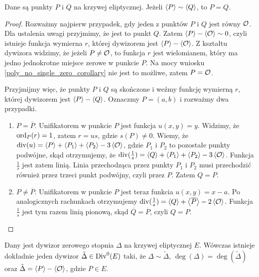 \begin{lemma}\label{sim_pq_eq_pq_lemma}
Dane są punkty $P$ i $Q$ na krzywej eliptycznej.
Jeżeli $\left\langle P\right\rangle \sim \left\langle Q\right\rangle$,
to $P = Q$.
\end{lemma}

\begin{proof}
Rozważmy najpierw przypadek,
gdy jeden z punktów $P$ i $Q$ jest równy $\mathcal{O}$.
Dla ustalenia uwagi przyjmimy, że jest to punkt $Q$.
Zatem $\left\langle P\right\rangle - \left\langle\mathcal{O}\right\rangle \sim 0$,
czyli istnieje funkcja wymierna $r$,
której dywizorem jest $\left\langle P\right\rangle - \left\langle\mathcal{O}\right\rangle$.
Z kształtu dywizora widzimy, że jeżeli $P \neq \mathcal{O}$, to funkcja $r$
jest wielomianem, który ma jedno jednokrotne miejsce zerowe w punkcie $P$.
Na mocy wniosku \ref{poly_no_single_zero_corollary} nie jest to możliwe,
zatem $P = \mathcal{O}$.

Przyjmijmy więc, że punkty $P$ i $Q$ są skończone
i weźmy funkcję wymierną $r$, której dywizorem jest $\left\langle P\right\rangle - \left\langle Q\right\rangle$.
Oznaczmy $P = (a, b)$ i rozważmy dwa przypadki.
\begin{enumerate}
\item $P = \overline{P}$.
Unifikatorem w punkcie $P$ jest funkcja $u(x, y) = y$.
Widzimy, że $\operatorname{ord}_P(r) = 1$, zatem $r = us$, gdzie $s(P) \neq 0$.
Wiemy, że $\operatorname{div}(u) = \left\langle P\right\rangle + \left\langle P_1\right\rangle + \left\langle P_2\right\rangle - 3\left\langle\mathcal{O}\right\rangle$,
gdzie $P_1$ i $P_2$ to pozostałe punkty podwójne,
skąd otrzymujemy, że
$\operatorname{div}(\frac{1}{s}) = \left\langle Q\right\rangle + \left\langle P_1\right\rangle + \left\langle P_2\right\rangle - 3\left\langle\mathcal{O}\right\rangle$.
Funkcja $\frac{1}{s}$ jest zatem linią.
Linia przechodząca przez punkty $P_1$ i $P_2$ musi przechodzić również przez
trzeci punkt podwójny, czyli przez $P$. Zatem $Q = P$.
\item $P \neq \overline{P}$.
Unifikatorem w punkcie $P$ jest teraz funkcia $u(x, y) = x - a$.
Po analogicznych rachunkach otrzymujemy
$\operatorname{div}(\frac{1}{s}) = \left\langle Q\right\rangle + \left\langle\overline{P}\right\rangle - 2\left\langle\mathcal{O}\right\rangle$.
Funkcja $\frac{1}{s}$ jest tym razem linią pionową,
skąd $\overline{Q} = \overline{P}$, czyli $Q = P$.
\end{enumerate}
\end{proof}

\begin{theorem}\label{zerodeg_divisor_linear_reduction_theorem}
Dany jest dywizor zerowego stopnia $\Delta$ na krzywej eliptycznej $E$.
Wówczas istnieje dokładnie jeden dywizor $\tilde{\Delta} \in \operatorname{Div}^0(E)$ taki,
że $\Delta \sim \tilde{\Delta}$, $\deg(\Delta) = \deg(\tilde{\Delta})$
oraz $\tilde{\Delta} = \left\langle P\right\rangle - \left\langle\mathcal{O}\right\rangle$,
gdzie $P \in E$.
\end{theorem}

